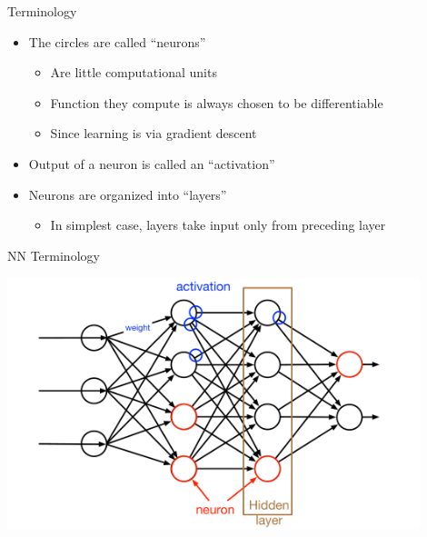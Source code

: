 \documentclass[aspectratio=169]{beamer}
\begin{document}
\begin{frame}{Terminology}

\begin{itemize}
	\item The circles are called ``neurons''
	\begin{itemize}
                \item Are little computational units
		\item Function they compute is always chosen to be differentiable
		\item Since learning is via gradient descent
	\end{itemize}	
	\item Output of a neuron is called an ``activation''
	\item Neurons are organized into ``layers''
	\begin{itemize}
                \item In simplest case, layers take input only from preceding layer
	\end{itemize}	
\end{itemize}
\end{frame}
\begin{frame}{NN Terminology}

\includegraphics[width=0.9\textwidth]{lectFF/nnTerms.pdf}
\end{frame}
\end{document}
